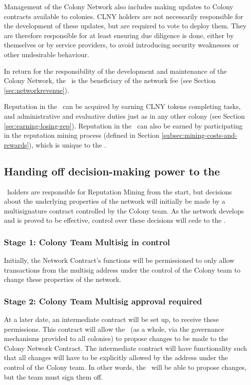 Management of the Colony Network also includes making updates to Colony contracts available to colonies. CLNY holders are not necessarily responsible for the development of these updates, but are required to vote to deploy them. They are therefore responsible for at least ensuring due diligence is done, either by themselves or by service providers, to avoid introducing security weaknesses or other undesirable behaviour.

In return for the responsibility of the development and maintenance of the Colony Network, the \rc\ is the beneficiary of the network fee (see Section \ref{sec:networkrevenue}).

Reputation in the \rc\ can be acquired by earning CLNY tokens completing tasks, and administrative and evaluative duties just as in any other colony (see Section \ref{sec:earning-losing-rep}). Reputation in the \rc\ can also be earned by participating in the reputation mining process (defined in Section \ref{subsec:mining-costs-and-rewards}), which is unique to the \rc.

\subsection{Handing off decision-making power to the \rc}\label{subsec:ceding-control-to-rc}
\rct\ holders are responsible for Reputation Mining from the start, but decisions about the underlying properties of the network will initially be made by a multisignature contract controlled by the Colony team. As the network develops and is proved to be effective, control over these decisions will cede to the \rc. 

\subsubsection*{Stage 1: Colony Team Multisig in control}
 Initially, the Network Contract's functions will be permissioned to only allow transactions from the multisig address under the control of the Colony team to change these properties of the network. 

\subsubsection*{Stage 2: Colony Team Multisig approval required}
At a later date, an intermediate contract will be set up, to receive these permissions. This contract will allow the \rc\ (as a whole, via the governance mechanisms provided to all colonies) to propose changes to be made to the Colony Network Contract. The intermediate contract will have functionality such that all changes will have to be explicitly allowed by the address under the control of the Colony team. In other words, the \rc\ will be able to propose changes, but the team must sign them off.

